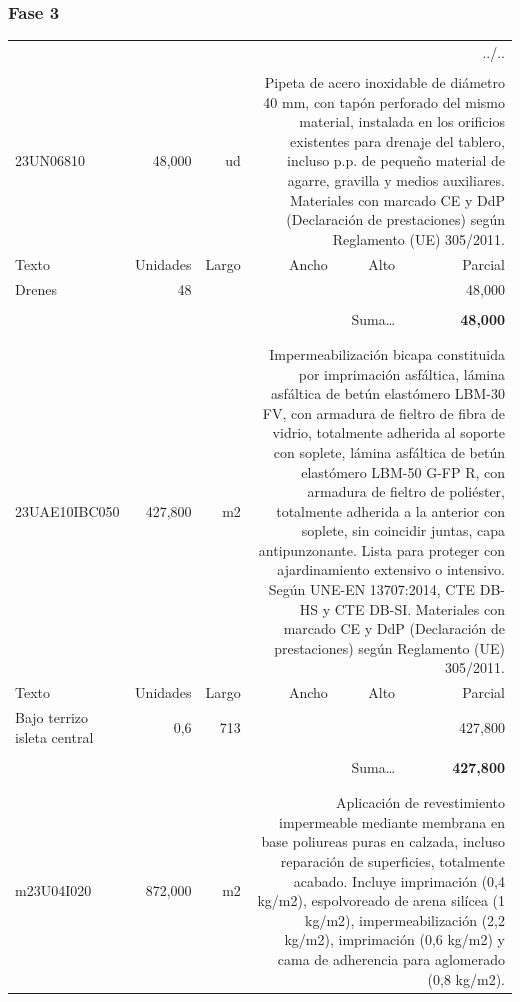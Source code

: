 \documentclass{book}%
\begin{document}
\subsubsection{Fase 3}%
\begin{longtable}{lrrrrr}%
\multicolumn{6}{r}{../..}\\%
\endfoot%
\endlastfoot%
&&&&&\\%
23UN06810&    48,000& ud&\multicolumn{3}{p{6cm}}{\scriptsize Pipeta de acero inoxidable de diámetro 40 mm, con tapón perforado del mismo material, instalada en los orificios existentes para drenaje del tablero, incluso p.p. de pequeño material de agarre, gravilla y medios auxiliares. Materiales con marcado CE y DdP (Declaración de prestaciones) según Reglamento (UE) 305/2011.\normalsize}\\%
Texto&Unidades&Largo&Ancho&Alto&Parcial\\%
\hline%
\multicolumn{1}{p{3.5cm}}{Drenes}&48&&&&    48,000\\%
&&&&&\\%
\multicolumn{5}{r}{Suma\ldots}&\textbf{    48,000}\\%
\hline%
&&&&&\\%
&&&&&\\%
23UAE10IBC050&   427,800& m2&\multicolumn{3}{p{6cm}}{\scriptsize Impermeabilización bicapa constituida por imprimación asfáltica, lámina asfáltica de betún elastómero LBM-30 FV, con armadura de fieltro de fibra de vidrio, totalmente adherida al soporte con soplete, lámina asfáltica de betún elastómero LBM-50 G-FP R, con armadura de fieltro de poliéster, totalmente adherida a la anterior con soplete, sin coincidir juntas, capa antipunzonante. Lista para proteger con ajardinamiento extensivo o intensivo. Según UNE-EN 13707:2014, CTE DB-HS y CTE DB-SI. Materiales con marcado CE y DdP (Declaración de prestaciones) según Reglamento (UE) 305/2011.\normalsize}\\%
Texto&Unidades&Largo&Ancho&Alto&Parcial\\%
\hline%
\multicolumn{1}{p{3.5cm}}{Bajo terrizo isleta central }&0,6&713&&&   427,800\\%
&&&&&\\%
\multicolumn{5}{r}{Suma\ldots}&\textbf{   427,800}\\%
\hline%
&&&&&\\%
&&&&&\\%
m23U04I020&   872,000& m2&\multicolumn{3}{p{6cm}}{\scriptsize Aplicación de revestimiento impermeable mediante membrana en base poliureas puras en calzada, incluso reparación de superficies, totalmente acabado. Incluye imprimación (0,4 kg/m2), espolvoreado de arena silícea (1 kg/m2), impermeabilización (2,2 kg/m2), imprimación (0,6 kg/m2) y cama de adherencia para aglomerado (0,8 kg/m2).\normalsize}\\%

\end{longtable}
\end{document}
